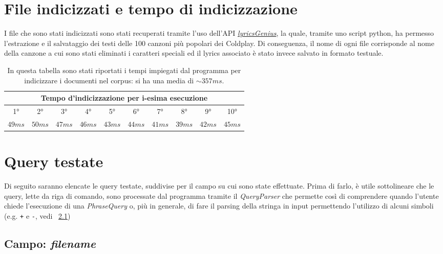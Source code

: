 \documentclass{article}
\begin{document}
\section{File indicizzati e tempo di indicizzazione}
I file che sono stati indicizzati sono stati recuperati tramite l'uso dell'API \href{https://lyricsgenius.readthedocs.io/en/master/}{\textit{lyricsGenius}}, la quale, tramite uno script python, ha permesso l'estrazione e il salvataggio dei testi delle 100 canzoni più popolari dei Coldplay. Di conseguenza, il nome di ogni file corrisponde al nome della canzone a cui sono stati eliminati i caratteri speciali ed il lyrics associato è stato invece salvato in formato testuale.
\begingroup
\setlength{\tabcolsep}{5pt} %
\renewcommand{\arraystretch}{1.5} %
\begin{center}
\begin{table}[h!]
    \begin{tabular}{|c|c|c|c|c|c|c|c|c|c|}
    \hline
    \multicolumn{10}{|c|}{Tempo d'indicizzazione per i-esima esecuzione}\\
    \hline
    1° & 2° & 3° & 4° & 5° & 6° & 7° & 8° & 9° & 10° \\
    \hline
        $49ms$ & $50ms$ & $47ms$ & $46ms$ & $43ms$ & $44ms$ & $41ms$ & $39ms$ & $42ms$ & $45ms$ \\
    \hline
    \end{tabular}
    \caption{In questa tabella sono stati riportati i tempi impiegati dal programma per indicizzare i documenti nel corpus: si ha una media di $\sim{357ms}$.}
\end{table}
\end{center}
\endgroup

\section{Query testate}
Di seguito saranno elencate le query testate, suddivise per il campo su cui sono state effettuate. Prima di farlo, è utile sottolineare che le query, lette da riga di comando, sono processate dal programma tramite il \textit{QueryParser} che permette così di comprendere quando l'utente chiede l'esecuzione di una \textit{PhraseQuery} o, più in generale, di fare il parsing della stringa in input permettendo l'utilizzo di alcuni simboli (e.g. \verb|+| e \verb|-|, vedi ~\ref{filenameFieldQuery})

\subsection{Campo: \textit{filename}} \label{filenameFieldQuery}
\end{document}
